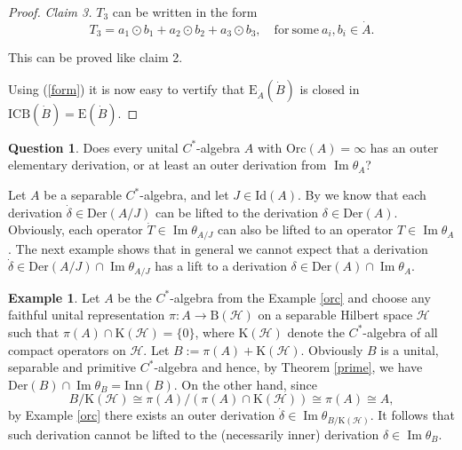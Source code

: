 \documentclass[]{amsart}
\theoremstyle{remark}
\theoremstyle{definition}
\newtheorem{example}[theorem]{Example}
\theoremstyle{question}
\newtheorem{question}[theorem]{Question}
\numberwithin{equation}{section}
\begin{document}
\begin{proof}
\textit{Claim 3.} $T_3$ can be written in
the form $$T_3 = a_1 \odot b_1 + a_2 \odot b_2+ a_3 \odot b_3, \quad
\mathrm{for} \ \mathrm{some}\  a_i,b_i \in \dot{A}.$$

This can be proved like claim 2.

Using (\ref{form}) it is now easy to vertify that ${\mathrm{E}}_{\dot{A}}(\dot{B})$ is closed
in $\mathrm{ICB}(\dot{B})={\mathrm{E}}(\dot{B})$.
\end{proof}
\begin{question} Does every unital $C^*$-algebra $A$ with
$\mathrm{Orc}(A)=\infty$ has an outer elementary derivation, or at least an
outer derivation from ${\mathop{\mathrm{Im}}} \theta_A$?
\end{question}

Let $A$ be a separable $C^*$-algebra, and let $J \in \mathrm{Id}(A)$. By \cite[8.6.15]{Ped}
we know that each derivation $\dot{\delta} \in \mathrm{Der}(A/J)$ can be lifted
to the derivation $\delta \in \mathrm{Der}(A)$. Obviously, each operator
$\dot{T} \in {\mathop{\mathrm{Im}}} \theta_{A/J}$ can also be lifted to an operator $T \in {\mathop{\mathrm{Im}}}
\theta_A$. The next example shows that in general we cannot expect that a
derivation $\dot{\delta} \in \mathrm{Der}(A/J) \cap {\mathop{\mathrm{Im}}}\theta_{A/J}$ has a lift
to a derivation $\delta \in \mathrm{Der}(A) \cap {\mathop{\mathrm{Im}}} \theta_A$.

\begin{example} Let $A$ be the $C^*$-algebra from the Example \ref{orc} and
choose any faithful unital representation $ \pi : A \to  {\mathrm{B}}(\mathcal{H})$ on a
separable Hilbert space $\mathcal{H}$ such that $\pi(A) \cap
\mathrm{K}(\mathcal{H})=\{0\}$, where $\mathrm{K}(\mathcal{H})$ denote the
$C^*$-algebra of all compact operators on $\mathcal{H}$. Let
$B:=\pi(A)+\mathrm{K}(\mathcal{H})$. Obviously $B$ is a unital, separable and primitive
$C^*$-algebra and hence, by Theorem \ref{prime}, we have $\mathrm{Der}(B) \cap {\mathop{\mathrm{Im}}}
\theta_B = \mathrm{Inn}(B)$. On the other hand, since
$$B/\mathrm{K}(\mathcal{H}) \cong \pi(A)/( \pi(A)\cap \mathrm{K}(\mathcal{H}))
\cong \pi(A) \cong A,$$
by Example \ref{orc}  there exists an outer derivation $\dot{\delta} \in {\mathop{\mathrm{Im}}}
\theta_{B/\mathrm{K}(\mathcal{H})}$. It follows that such derivation cannot be lifted
to the (necessarily inner) derivation $\delta \in {\mathop{\mathrm{Im}}} \theta_B$.

\end{example}
\end{document}
